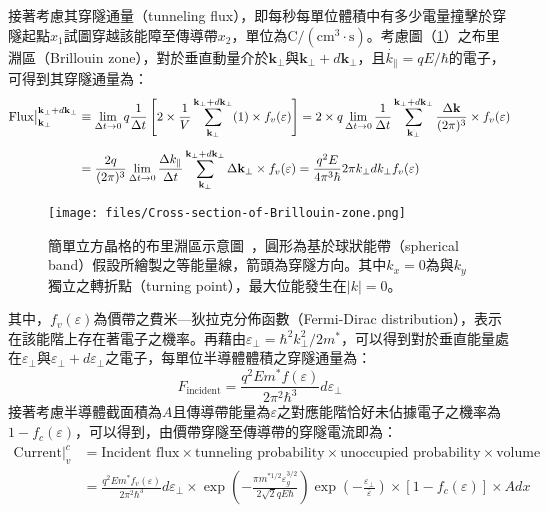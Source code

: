 接著考慮其穿隧通量（tunneling flux），即每秒每單位體積中有多少電量撞擊於穿隧起點$x_1$試圖穿越該能障至傳導帶$x_2$，單位為$\mathrm{C}/(\mathrm{cm}^3\cdot\mathrm{s})$。考慮圖（\ref{fig:ideal-Brillouin-zone}）之布里淵區（Brillouin zone），對於垂直動量介於$\mathbf{k}_\perp$與$\mathbf{k}_\perp+d\mathbf{k}_\perp$，且$\dot{k_\parallel}=qE/\hbar$的電子，可得到其穿隧通量為：
\begin{equation}
\begin{aligned}
\textup{Flux}\big\vert_{\mathbf{k}_\perp}^{\mathbf{k}_\perp+d\mathbf{k}_\perp}&\equiv \lim_{\Delta t\to0}q\frac{1}{\Delta t}\left[2\times\frac{1}{V}\sum_{\mathbf{k}_\perp}^{\mathbf{k}_\perp+d\mathbf{k}_\perp}(1)\times f_v(\varepsilon)\right]=2\times q\lim_{\Delta t\to0}\frac{1}{\Delta t}\sum_{\mathbf{k}_\perp}^{\mathbf{k}_\perp+d\mathbf{k}_\perp}\frac{\Delta \mathbf{k}}{(2\pi)^3}\times f_v(\varepsilon)\\[5pt]
&=\frac{2q}{(2\pi)^3}\lim_{\Delta t\to0}\frac{\Delta k_\parallel}{\Delta t}\sum_{\mathbf{k}_\perp}^{\mathbf{k}_\perp+d\mathbf{k}_\perp}\Delta \mathbf{k}_\perp\times f_v(\varepsilon)=\frac{q^2E}{4\pi^3\hbar}2\pi k_\perp dk_\perp f_v(\varepsilon)
\end{aligned}
\end{equation}
\begin{figure}
\centering
\hspace*{2.2cm}\texttt{[image: files/Cross-section-of-Brillouin-zone.png]}
\caption[簡單立方晶格的布里淵區示意圖]{簡單立方晶格的布里淵區示意圖~\cite{PhysSMCMoll}，圓形為基於球狀能帶（spherical band）假設所繪製之等能量線，箭頭為穿隧方向。其中$k_x=0$為與$k_y$獨立之轉折點（turning point），最大位能發生在$|k|=0$。}
\label{fig:ideal-Brillouin-zone}
\end{figure}其中，$f_v(\varepsilon)$為價帶之費米—狄拉克分佈函數（Fermi-Dirac distribution），表示在該能階上存在著電子之機率。再藉由$\varepsilon_\perp=\hbar^2k_\perp^2/2m^*$，可以得到對於垂直能量處在$\varepsilon_\perp$與$\varepsilon_\perp+d\varepsilon_\perp$之電子，每單位半導體體積之穿隧通量為：
\begin{equation}
F_\text{incident}=\frac{q^2Em^*f(\varepsilon)}{2\pi^2\hbar^3}d\varepsilon_\perp
\end{equation}
接著考慮半導體截面積為$A$且傳導帶能量為$\varepsilon$之對應能階恰好未佔據電子之機率為$1-f_c(\varepsilon)$，可以得到，由價帶穿隧至傳導帶的穿隧電流即為：
\begin{equation}
\begin{aligned}
\text{Current}\big\vert_v^c&=\text{Incident flux}\times\text{tunneling probability}\times\text{unoccupied probability}\times\text{volume}\\[5pt]
&=\frac{q^2Em^*f_v(\varepsilon)}{2\pi^2\hbar^3}d\varepsilon_\perp\times\exp\left(-\frac{\pi m^{*1/2}\varepsilon_g^{3/2}}{2\sqrt{2}qE\hbar}\right)\exp\left(-\frac{\varepsilon_\perp}{\bar{\varepsilon}}\right)\times[1-f_c(\varepsilon)]\times Adx
\end{aligned}
\end{equation}
